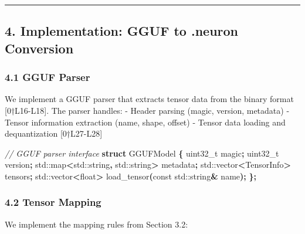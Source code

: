 \documentclass[
  11pt,
  a4paper,
]{article}
\newenvironment{Shaded}{\begin{snugshade}}{\end{snugshade}}
\newcommand{\AttributeTok}[1]{\textcolor[rgb]{0.13,0.29,0.53}{#1}}
\newcommand{\BuiltInTok}[1]{#1}
\newcommand{\CommentTok}[1]{\textcolor[rgb]{0.56,0.35,0.01}{\textit{#1}}}
\newcommand{\DataTypeTok}[1]{\textcolor[rgb]{0.13,0.29,0.53}{#1}}
\newcommand{\KeywordTok}[1]{\textcolor[rgb]{0.13,0.29,0.53}{\textbf{#1}}}
\newcommand{\NormalTok}[1]{#1}
\newcommand{\OperatorTok}[1]{\textcolor[rgb]{0.81,0.36,0.00}{\textbf{#1}}}
\begin{document}
\begin{center}\rule{0.5\linewidth}{0.5pt}\end{center}

\subsection{4. Implementation: GGUF to .neuron
Conversion}\label{implementation-gguf-to-.neuron-conversion}

\subsubsection{4.1 GGUF Parser}\label{gguf-parser}

We implement a GGUF parser that extracts tensor data from the binary
format {[}0†L16-L18{]}. The parser handles: - Header parsing (magic,
version, metadata) - Tensor information extraction (name, shape, offset)
- Tensor data loading and dequantization {[}0†L27-L28{]}

\begin{Shaded}
\begin{Highlighting}[]
\CommentTok{// GGUF parser interface}
\KeywordTok{struct}\NormalTok{ GGUFModel }\OperatorTok{\{}
    \DataTypeTok{uint32\_t}\NormalTok{ magic}\OperatorTok{;}
    \DataTypeTok{uint32\_t}\NormalTok{ version}\OperatorTok{;}
    \BuiltInTok{std::}\NormalTok{map}\OperatorTok{\textless{}}\BuiltInTok{std::}\NormalTok{string}\OperatorTok{,} \BuiltInTok{std::}\NormalTok{string}\OperatorTok{\textgreater{}}\NormalTok{ metadata}\OperatorTok{;}
    \BuiltInTok{std::}\NormalTok{vector}\OperatorTok{\textless{}}\NormalTok{TensorInfo}\OperatorTok{\textgreater{}}\NormalTok{ tensors}\OperatorTok{;}
    \BuiltInTok{std::}\NormalTok{vector}\OperatorTok{\textless{}}\DataTypeTok{float}\OperatorTok{\textgreater{}}\NormalTok{ load\_tensor}\OperatorTok{(}\AttributeTok{const} \BuiltInTok{std::}\NormalTok{string}\OperatorTok{\&}\NormalTok{ name}\OperatorTok{);}
\OperatorTok{\};}
\end{Highlighting}
\end{Shaded}

\subsubsection{4.2 Tensor Mapping}\label{tensor-mapping}

We implement the mapping rules from Section 3.2:
\end{document}
